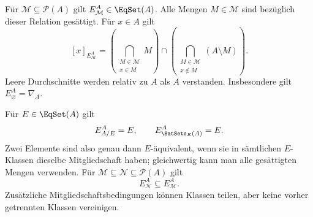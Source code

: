\begin{theorem}
Für $\mathcal M\subseteq\mathcal P(A)$ gilt
$E_{\mathcal M}^A\in\EqSet(A)$. Alle Mengen $M\in\mathcal M$
sind bezüglich dieser Relation gesättigt.
Für $x\in A$ gilt
\[
 [x]_{E_{\mathcal M}^A}
 =
 \left(\bigcap_{\substack{M\in\mathcal M\\x\in M}}M\right)
 \cap
 \left(\bigcap_{\substack{M\in\mathcal M\\x\notin M}}(A\setminus M)\right).
\]
Leere Durchschnitte werden relativ zu $A$ als $A$ verstanden.
Insbesondere gilt $E_{\varnothing}^A=\nabla_A$.
\end{theorem}

\begin{theorem}
\label{b11guide:thm:recover}
Für $E\in\EqSet(A)$ gilt
\[
 E_{A/E}^A=E,\qquad E_{\SatSets_E(A)}^A=E.
\]
Zwei Elemente sind also genau dann $E$-äquivalent, wenn sie
in sämtlichen $E$-Klassen dieselbe Mitgliedschaft haben;
gleichwertig kann man alle gesättigten Mengen verwenden.
Für $\mathcal M\subseteq\mathcal N\subseteq\mathcal P(A)$ gilt
\[
 E_{\mathcal N}^A\subseteq E_{\mathcal M}^A.
\]
Zusätzliche Mitgliedschaftsbedingungen können Klassen teilen,
aber keine vorher getrennten Klassen vereinigen.
\end{theorem}

